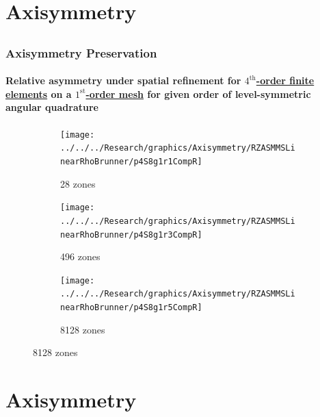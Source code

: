 \documentclass[compress,t]{beamer}
\begin{document}
\section{Axisymmetry}
\subsection{}

\begin{frame}
\frametitle{Axisymmetry Preservation}
\framesubtitle{Relative asymmetry under spatial refinement for \underline{$4^\text{th}$-order finite elements} on a \underline{$1^\text{st}$-order mesh} for given order of level-symmetric angular quadrature}

\begin{figure}
\centering
\begin{subfigure}{0.33\textwidth}
\centering
\texttt{[image: ../../../Research/graphics/Axisymmetry/RZASMMSLinearRhoBrunner/p4S8g1r1CompR]}
\caption{28 zones}
\end{subfigure}%
\begin{subfigure}{0.33\textwidth}
\centering
\texttt{[image: ../../../Research/graphics/Axisymmetry/RZASMMSLinearRhoBrunner/p4S8g1r3CompR]}
\caption{496 zones}
\end{subfigure}%
\begin{subfigure}{0.33\textwidth}
\centering
\texttt{[image: ../../../Research/graphics/Axisymmetry/RZASMMSLinearRhoBrunner/p4S8g1r5CompR]}
\caption{8128 zones}
\end{subfigure}
\end{figure}

\end{frame}

\section{Axisymmetry}
\subsection{}
\end{document}
